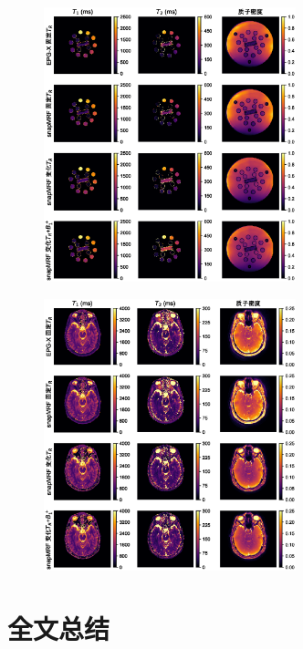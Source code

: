 \documentclass{beamer}
\begin{document}
\begin{frame}
\begin{figure}
\centering
\includegraphics[width=0.65\textwidth]{../img/snapmrf/figure2.eps}
\end{figure}
\end{frame}

\begin{frame}
\begin{figure}
\centering
\includegraphics[width=0.65\textwidth]{../img/snapmrf/figure3.eps}
\end{figure}
\end{frame}

\section{全文总结}
\end{document}

